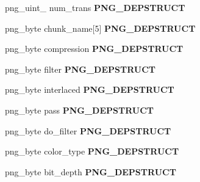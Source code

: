 \begin{DoxyCompactItemize}
\item 
png\+\_\+uint\+\_ num\+\_\+trans {\bfseries P\+N\+G\+\_\+\+D\+E\+P\+S\+T\+R\+U\+CT}\hypertarget{structpng__struct__def_adffd20cdb7e6d66cf9df133cc5fce422}{}\label{structpng__struct__def_adffd20cdb7e6d66cf9df133cc5fce422}

\item 
png\+\_\+byte chunk\+\_\+name\mbox{[}5\mbox{]} {\bfseries P\+N\+G\+\_\+\+D\+E\+P\+S\+T\+R\+U\+CT}\hypertarget{structpng__struct__def_ab9b72aba69403b54093bfad1374b9433}{}\label{structpng__struct__def_ab9b72aba69403b54093bfad1374b9433}

\item 
png\+\_\+byte compression {\bfseries P\+N\+G\+\_\+\+D\+E\+P\+S\+T\+R\+U\+CT}\hypertarget{structpng__struct__def_a7b2fbacd827608073bd2dba311c83264}{}\label{structpng__struct__def_a7b2fbacd827608073bd2dba311c83264}

\item 
png\+\_\+byte filter {\bfseries P\+N\+G\+\_\+\+D\+E\+P\+S\+T\+R\+U\+CT}\hypertarget{structpng__struct__def_a4eaae041dd2f55d98f3fe322d6ba73a6}{}\label{structpng__struct__def_a4eaae041dd2f55d98f3fe322d6ba73a6}

\item 
png\+\_\+byte interlaced {\bfseries P\+N\+G\+\_\+\+D\+E\+P\+S\+T\+R\+U\+CT}\hypertarget{structpng__struct__def_a8ea29dd2b85d2f1e23fb7800188ab71a}{}\label{structpng__struct__def_a8ea29dd2b85d2f1e23fb7800188ab71a}

\item 
png\+\_\+byte pass {\bfseries P\+N\+G\+\_\+\+D\+E\+P\+S\+T\+R\+U\+CT}\hypertarget{structpng__struct__def_a95bf092b34ba1f3c6b2942a55b296e86}{}\label{structpng__struct__def_a95bf092b34ba1f3c6b2942a55b296e86}

\item 
png\+\_\+byte do\+\_\+filter {\bfseries P\+N\+G\+\_\+\+D\+E\+P\+S\+T\+R\+U\+CT}\hypertarget{structpng__struct__def_a24711a80f877c416ca001447834849a5}{}\label{structpng__struct__def_a24711a80f877c416ca001447834849a5}

\item 
png\+\_\+byte color\+\_\+type {\bfseries P\+N\+G\+\_\+\+D\+E\+P\+S\+T\+R\+U\+CT}\hypertarget{structpng__struct__def_a9a62118608ad646bef4859cbe3bb2c41}{}\label{structpng__struct__def_a9a62118608ad646bef4859cbe3bb2c41}

\item 
png\+\_\+byte bit\+\_\+depth {\bfseries P\+N\+G\+\_\+\+D\+E\+P\+S\+T\+R\+U\+CT}\hypertarget{structpng__struct__def_a011a5934e2a73cdf4282b092ec58e226}{}\label{structpng__struct__def_a011a5934e2a73cdf4282b092ec58e226}


\end{DoxyCompactItemize}
